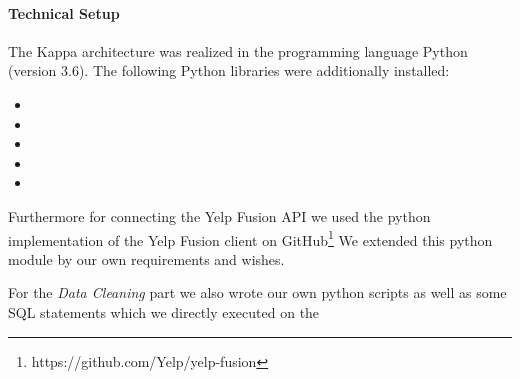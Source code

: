 \paragraph{Technical Setup}
\label{par:setup}
The Kappa architecture was realized in the programming language Python (version 3.6).
The following Python libraries were additionally installed:

\begin{itemize}
  \item {}
  \item {}
  \item {}
  \item {}
  \item {}
\end{itemize}

Furthermore for connecting the Yelp Fusion \ac{API} we used the python implementation of the Yelp Fusion client on GitHub\footnote{https://github.com/Yelp/yelp-fusion}
We extended this python module by our own requirements and wishes.

For the \textit{Data Cleaning} part we also wrote our own python scripts as well as some \ac{SQL} statements which we directly executed on the \pg{}
